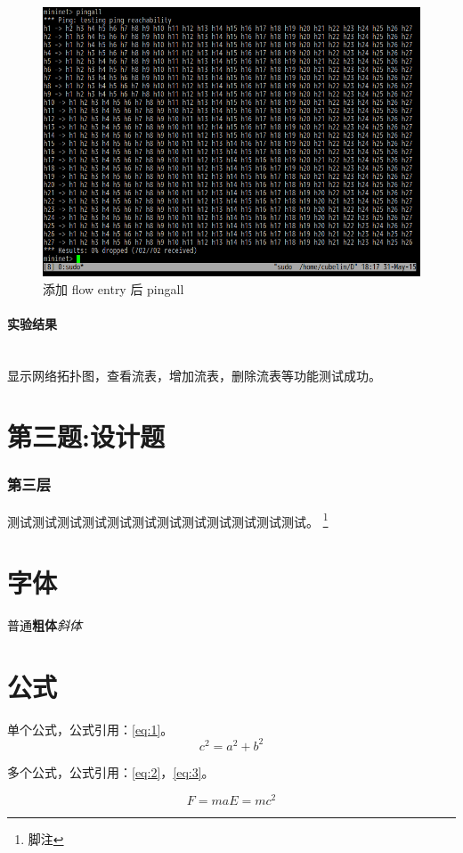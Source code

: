 \documentclass[format=draft,language=chinese,category=SDN]{hustreport}
\newcommand{\myparagraph}[1]{\paragraph{#1}\mbox{}\\}
\begin{document}
\begin{figure}[!h]
\centering
\includegraphics[width=.5\textwidth]{fig/2_2-8.png}
\caption{添加 flow entry 后 pingall}\label{fig:Q2_2-8}
\end{figure}

\myparagraph{实验结果}

显示网络拓扑图，查看流表，增加流表，删除流表等功能测试成功。

\clearpage

\section{第三题:设计题}\label{sec:Q3}

\subsubsection{第三层}\label{sec:3}
测试测试测试测试测试测试测试测试测试测试测试测试。
\footnote{\label{footnote:1}脚注}

\section{字体}

普通\textbf{粗体}\emph{斜体}


\section{公式}

单个公式，公式引用：\autoref{eq:1}。
\begin{equation}
 c^2 = a^2 + b^2 \label{eq:1}
\end{equation}

多个公式，公式引用：\autoref{eq:2}，\autoref{eq:3}。

\begin{subequations}
\begin{equation}
  F = ma \label{eq:2}
\end{equation}
\begin{equation}
  E = mc^2 \label{eq:3}
\end{equation}
\end{subequations}
\end{document}
